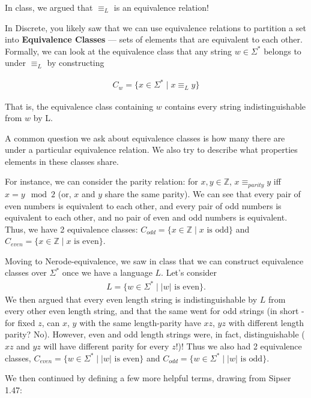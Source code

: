 \documentclass{exam}
\theoremstyle{definition}
\begin{document}
In class, we argued that $\equiv_L$ is an equivalence relation! 

In Discrete, you likely saw that we can use equivalence relations to partition a set into \textbf{Equivalence Classes} --- sets of elements that are equivalent to each other. Formally, we can look at the equivalence class that any string $w \in \Sigma^*$ belongs to under $\equiv_L$ by constructing

\begin{align*}
    C_w = \{x \in \Sigma^* \mid  x \equiv_L y \}
\end{align*}

That is, the equivalence class containing $w$ contains every string indistinguishable from $w$ by L.

A common question we ask about equivalence classes is how many there are under a particular equivalence relation. We also try to describe what properties elements in these classes share. 

For instance, we can consider the parity relation: for $x,y \in \mathbb{Z}$, $x \equiv_{parity} y$ iff $x = y \mod{2}$ (or, $x$ and $y$ share the same parity). We can see that every pair of even numbers is equivalent to each other, and every pair of odd numbers is equivalent to each other, and no pair of even and odd numbers is equivalent. Thus, we have 2 equivalence classes: $C_{odd} = \{x \in \mathbb{Z} \mid \text{$x$ is odd}\}$ and $C_{even} = \{x \in \mathbb{Z} \mid \text{$x$ is even}\}$.

Moving to Nerode-equivalence, we saw in class that we can construct equivalence classes over $\Sigma^*$ once we have a language $L$. Let's consider 
\begin{align*}
    L = \{ w \in \Sigma^* \mid \text{$\lvert w \rvert$ is even}\}.
\end{align*}
We then argued that every even length string is indistinguishable by $L$ from every other even length string, and that the same went for odd strings (in short - for fixed $z$, can $x$, $y$ with the same length-parity have $xz$, $yz$ with different length parity? No). However, even and odd length strings were, in fact, distinguishable ($xz$ and $yz$ will have different parity for every $z$!)! Thus we also had 2 equivalence classes, $C_{even} = \{w \in \Sigma^* \mid \text{$\lvert w \rvert$ is even}\}$ and $C_{odd} = \{w \in \Sigma^* \mid \text{$\lvert w \rvert$ is odd}\}$.

We then continued by defining a few more helpful terms, drawing from Sipser 1.47:
\end{document}
